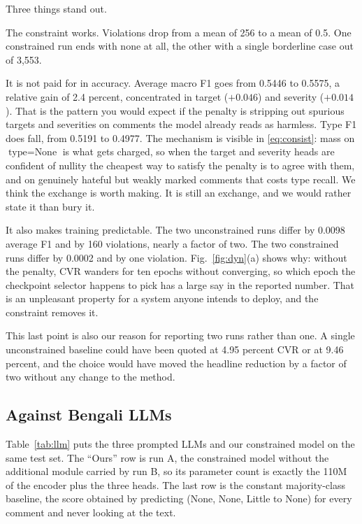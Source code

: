 \documentclass[conference]{IEEEtran}
\begin{document}
Three things stand out.

The constraint works. Violations drop from a mean of 256 to a mean of 0.5. One constrained run ends with none at all, the other with a single borderline case out of 3{,}553.

It is not paid for in accuracy. Average macro F1 goes from 0.5446 to 0.5575, a relative gain of 2.4 percent, concentrated in target ($+0.046$) and severity ($+0.014$). That is the pattern you would expect if the penalty is stripping out spurious targets and severities on comments the model already reads as harmless. Type F1 does fall, from 0.5191 to 0.4977. The mechanism is visible in \eqref{eq:consist}: mass on $\text{type}=\text{None}$ is what gets charged, so when the target and severity heads are confident of nullity the cheapest way to satisfy the penalty is to agree with them, and on genuinely hateful but weakly marked comments that costs type recall. We think the exchange is worth making. It is still an exchange, and we would rather state it than bury it.

It also makes training predictable. The two unconstrained runs differ by 0.0098 average F1 and by 160 violations, nearly a factor of two. The two constrained runs differ by 0.0002 and by one violation. Fig.~\ref{fig:dyn}(a) shows why: without the penalty, CVR wanders for ten epochs without converging, so which epoch the checkpoint selector happens to pick has a large say in the reported number. That is an unpleasant property for a system anyone intends to deploy, and the constraint removes it.

This last point is also our reason for reporting two runs rather than one. A single unconstrained baseline could have been quoted at 4.95 percent CVR or at 9.46 percent, and the choice would have moved the headline reduction by a factor of two without any change to the method.

\subsection{Against Bengali LLMs}
\label{sec:llm}
Table~\ref{tab:llm} puts the three prompted LLMs and our constrained model on the same test set. The ``Ours'' row is run A, the constrained model without the additional module carried by run B, so its parameter count is exactly the 110M of the encoder plus the three heads. The last row is the constant majority-class baseline, the score obtained by predicting (None, None, Little to None) for every comment and never looking at the text.
\end{document}
